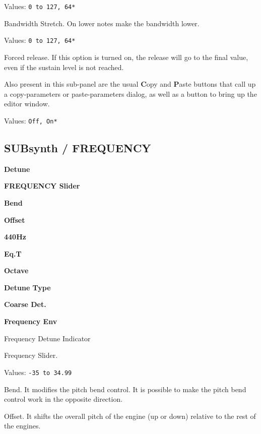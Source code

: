    Values: \texttt{0 to 127, 64*}

   Bandwidth Stretch. On lower notes make the bandwidth lower.

   Values: \texttt{0 to 127, 64*}

   Forced release.
   If this option is turned on, the release will go to the
   final value, even if the sustain level is not reached.

   Also present in this sub-panel are the usual \textbf{C}opy
   and \textbf{P}aste buttons that call up a copy-parameters or
   paste-parameters dialog, as well as a button
   to bring up the editor window.

   Values: \texttt{Off, On*}

\subsection{SUBsynth / FREQUENCY}
\label{subsec:subsynth_frequency}

   \begin{enumber}
      \item \textbf{Detune}
      \item \textbf{FREQUENCY Slider}
      \item \textbf{Bend}
      \item \textbf{Offset}
      \item \textbf{440Hz}
      \item \textbf{Eq.T}
      \item \textbf{Octave}
      \item \textbf{Detune Type}
      \item \textbf{Coarse Det.}
      \item \textbf{Frequency Env}
   \end{enumber}

   \setcounter{ItemCounter}{0}      %

   Frequency Detune Indicator

   Frequency Slider.

   Values: \texttt{-35 to 34.99}

   Bend.
   It modifies the pitch bend control.  It is possible to make the pitch
   bend control work in the opposite direction.

   Offset.
   It shifts the overall pitch of the engine (up or down) relative to the rest
   of the engines.

